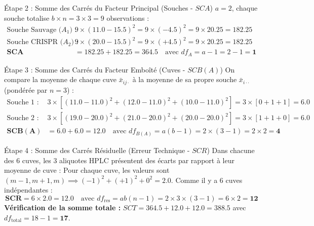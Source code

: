 \documentclass[11pt,a4paper]{article}
\begin{document}
\begin{stepbox}{Étape 2 : Somme des Carrés du Facteur Principal (Souches - $SCA$)}
$a = 2$, chaque souche totalise $b \times n = 3 \times 3 = 9$ observations :
\begin{align*}
\text{Souche Sauvage ($A_1$) :} \quad & 9 \times (11.0 - 15.5)^2 = 9 \times (-4.5)^2 = 9 \times 20.25 = 182.25 \\
\text{Souche CRISPR ($A_2$) :} \quad & 9 \times (20.0 - 15.5)^2 = 9 \times (+4.5)^2 = 9 \times 20.25 = 182.25 \\[2mm]
\mathbf{SCA} &= 182.25 + 182.25 = \mathbf{364.5} \quad \text{avec } df_A = a - 1 = 2 - 1 = \mathbf{1}
\end{align*}
\end{stepbox}

\begin{stepbox}{Étape 3 : Somme des Carrés du Facteur Emboîté (Cuves - $SCB(A)$)}
On compare la moyenne de chaque cuve $\bar{x}_{ij\cdot}$ à la moyenne de sa propre souche $\bar{x}_{i\cdot\cdot}$ (pondérée par $n = 3$) :
\begin{align*}
\text{Souche 1 :} \quad & 3 \times \left[ (11.0 - 11.0)^2 + (12.0 - 11.0)^2 + (10.0 - 11.0)^2 \right] = 3 \times [0 + 1 + 1] = 6.0 \\[1mm]
\text{Souche 2 :} \quad & 3 \times \left[ (19.0 - 20.0)^2 + (21.0 - 20.0)^2 + (20.0 - 20.0)^2 \right] = 3 \times [1 + 1 + 0] = 6.0 \\[2mm]
\mathbf{SCB(A)} &= 6.0 + 6.0 = \mathbf{12.0} \quad \text{avec } df_{B(A)} = a(b - 1) = 2 \times (3 - 1) = 2 \times 2 = \mathbf{4}
\end{align*}
\end{stepbox}

\begin{stepbox}{Étape 4 : Somme des Carrés Résiduelle (Erreur Technique - $SCR$)}
Dans chacune des 6 cuves, les 3 aliquotes HPLC présentent des écarts par rapport à leur moyenne de cuve :
Pour chaque cuve, les valeurs sont $(m-1, m+1, m) \implies (-1)^2 + (+1)^2 + 0^2 = 2.0$.
Comme il y a 6 cuves indépendantes :
\begin{equation*}
\mathbf{SCR} = 6 \times 2.0 = \mathbf{12.0} \quad \text{avec } df_{\text{res}} = ab(n - 1) = 2 \times 3 \times (3 - 1) = 6 \times 2 = \mathbf{12}
\end{equation*}
\textbf{Vérification de la somme totale :} $SCT = 364.5 + 12.0 + 12.0 = \mathbf{388.5}$ avec $df_{\text{total}} = 18 - 1 = \mathbf{17}$.
\end{stepbox}
\end{document}
